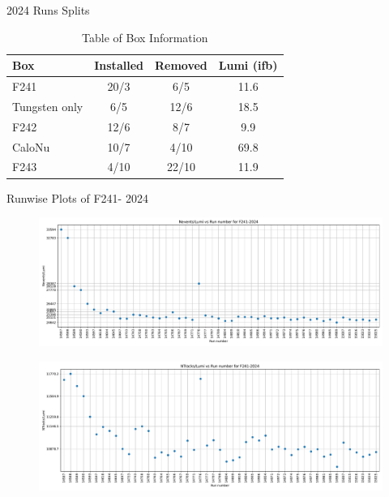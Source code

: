 \begin{frame}{2024 Runs Splits}
    \begin{table}[h!]
        \begin{tabular}{|l|c|c|c|}
            \hline
            \textbf{Box}  & \textbf{Installed} & \textbf{Removed} & \textbf{Lumi (ifb)} \\ \hline
            F241          & 20/3               & 6/5              & 11.6                \\ \hline
            Tungsten only & 6/5                & 12/6             & 18.5                \\ \hline
            F242          & 12/6               & 8/7              & 9.9                 \\ \hline
            CaloNu        & 10/7               & 4/10             & 69.8                \\ \hline
            F243          & 4/10               & 22/10            & 11.9                \\ \hline
        \end{tabular}
        \caption{Table of Box Information}
    \end{table}
\end{frame}

\begin{frame}{Runwise Plots of F241- 2024}
    \begin{figure}
        \centering
        \includegraphics[width=1.0\textwidth]{plots_runwise/NEventsbyLumi_2024_F241.pdf}
    \end{figure}
    \vspace{-0.35cm}
    \begin{figure}
        \centering
        \includegraphics[width=1.0\textwidth]{plots_runwise/NTracksbyLumi_2024_F241.pdf}
    \end{figure}
\end{frame}

